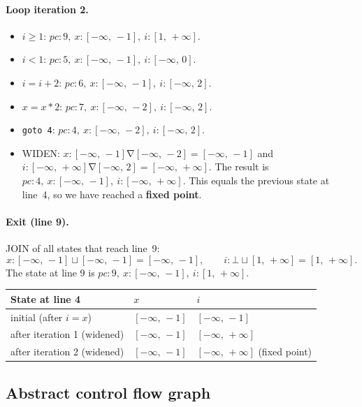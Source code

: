 \documentclass[11pt,a4paper]{article}
\newcommand{\st}[3]{$\mathit{pc}\colon #1,\allowbreak\ x\colon #2,\allowbreak\ i\colon #3$}
\newcommand{\itv}[2]{[#1,\,#2]}
\newcommand{\ninf}{-\infty}
\newcommand{\pinf}{+\infty}
\begin{document}
\paragraph{Loop iteration 2.}
\begin{itemize}
  \item $i \ge 1$: \st{9}{\itv{\ninf}{-1}}{\itv{1}{\pinf}}.
  \item $i < 1$: \st{5}{\itv{\ninf}{-1}}{\itv{\ninf}{0}}.
  \item $i = i + 2$: \st{6}{\itv{\ninf}{-1}}{\itv{\ninf}{2}}.
  \item $x = x * 2$: \st{7}{\itv{\ninf}{-2}}{\itv{\ninf}{2}}.
  \item \texttt{goto 4}: \st{4}{\itv{\ninf}{-2}}{\itv{\ninf}{2}}.
  \item WIDEN:
        $x\colon \itv{\ninf}{-1} \mathbin{\nabla} \itv{\ninf}{-2} = \itv{\ninf}{-1}$ and
        $i\colon \itv{\ninf}{\pinf} \mathbin{\nabla} \itv{\ninf}{2} = \itv{\ninf}{\pinf}$.
        The result is \st{4}{\itv{\ninf}{-1}}{\itv{\ninf}{\pinf}}. This equals the previous
        state at line~4, so we have reached a \textbf{fixed point}.
\end{itemize}

\paragraph{Exit (line 9).}
JOIN of all states that reach line~9:
\[
  x\colon \itv{\ninf}{-1} \sqcup \itv{\ninf}{-1} = \itv{\ninf}{-1}, \qquad
  i\colon \bot \sqcup \itv{1}{\pinf} = \itv{1}{\pinf}.
\]
The state at line 9 is \st{9}{\itv{\ninf}{-1}}{\itv{1}{\pinf}}.

\begin{center}
\begin{tabular}{@{}lll@{}}
  \toprule
  State at line 4 & $x$ & $i$ \\
  \midrule
  initial (after $i = x$)        & $\itv{\ninf}{-1}$ & $\itv{\ninf}{-1}$ \\
  after iteration 1 (widened)    & $\itv{\ninf}{-1}$ & $\itv{\ninf}{\pinf}$ \\
  after iteration 2 (widened)    & $\itv{\ninf}{-1}$ & $\itv{\ninf}{\pinf}$ \quad (fixed point) \\
  \bottomrule
\end{tabular}
\end{center}

\newpage
\subsection*{Abstract control flow graph}
\end{document}

